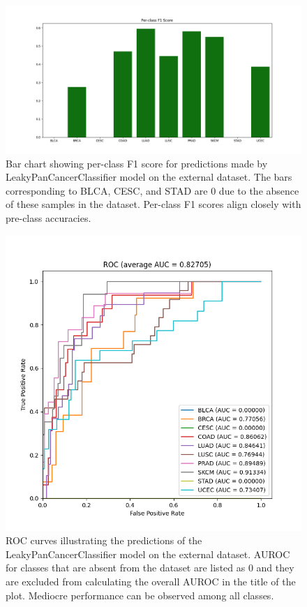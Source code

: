 \documentclass{l4proj}
\begin{document}
\begin{appendices}
\begin{figure}
    \centering
    \includegraphics[width=\linewidth]{images/per_class_f1_ext.png}
    \caption{Bar chart showing per-class F1 score for predictions made by LeakyPanCancerClassifier model on the external dataset. The bars corresponding to BLCA, CESC, and STAD are 0 due to the absence of these samples in the dataset. Per-class F1 scores align closely with pre-class accuracies.}
    \label{fig:class-f1-ext}
\end{figure}

\begin{figure}
    \centering
    \includegraphics[width=.75\linewidth]{images/ext_roc.png}
    \caption{ROC curves illustrating the predictions of the LeakyPanCancerClassifier model on the external dataset.  AUROC for classes that are absent from the dataset are listed as 0 and they are excluded from calculating the overall AUROC in the title of the plot. Mediocre performance can be observed among all classes.}
    \label{fig:ext-roc}
\end{figure}


\end{appendices}
\end{document}
